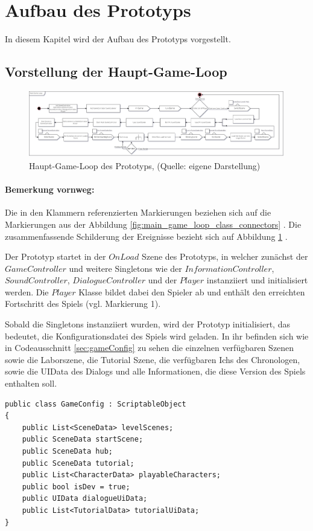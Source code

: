 \section{Aufbau des Prototyps}\label{sec:rework}
In diesem Kapitel wird der Aufbau des Prototyps vorgestellt. 

\subsection{Vorstellung der Haupt-Game-Loop}\label{sec:main-game-loop}
\begin{figure}[ht]
\centering
\includegraphics[width=1\linewidth]{content/pictures/Game-Loop_Prototype.jpg}
\caption{Haupt-Game-Loop des Prototyps, (Quelle: eigene Darstellung)}
\label{fig:main_game_loop}
\end{figure}

\paragraph{Bemerkung vornweg:}
Die in den Klammern referenzierten Markierungen beziehen sich auf die Markierungen aus der Abbildung \ref{fig:main_game_loop_class_connectors} . Die zusammenfassende Schilderung der Ereignisse bezieht sich auf Abbildung \ref{fig:main_game_loop} .


Der Prototyp startet in der $OnLoad$ Szene des Prototyps, in welcher zunächst der $GameController$ und weitere Singletons wie der $InformationController$, $SoundController$, $DialogueController$ und der $Player$ instanziiert und initialisiert werden. Die $Player$ Klasse bildet dabei den Spieler ab und enthält den erreichten Fortschritt des Spiels (vgl. Markierung 1).

Sobald die Singletons instanziiert wurden, wird der Prototyp initialisiert, das bedeutet, die Konfigurationsdatei des Spiels wird geladen. In ihr befinden sich wie in Codeausschnitt \ref{sec:gameConfig} zu sehen die einzelnen verfügbaren Szenen sowie die Laborszene, die Tutorial Szene, die verfügbaren Ichs des Chronologen, sowie die UIData des Dialogs und alle Informationen, die diese Version des Spiels enthalten soll.
\begin{lstlisting}[caption={GameConfig des Prototyps}, label={sec:gameConfig}]
public class GameConfig : ScriptableObject
{
    public List<SceneData> levelScenes;
    public SceneData startScene;
    public SceneData hub;
    public SceneData tutorial;
    public List<CharacterData> playableCharacters;
    public bool isDev = true;
    public UIData dialogueUiData;
    public List<TutorialData> tutorialUiData;
}
\end{lstlisting}


